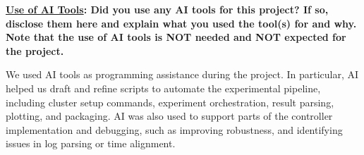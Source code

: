 \begin{enumerate}
    




\end{enumerate}

\noindent
\textbf{\underline{Use of AI Tools}: Did you use any AI tools for this project? If so, disclose them here and explain what you used the tool(s) for and why. Note that the use of AI tools is NOT needed and NOT expected for the project.}

We used AI tools as programming assistance during the project. In particular, AI helped us draft and refine scripts to automate the experimental pipeline, including cluster setup commands, experiment orchestration, result parsing, plotting, and packaging. AI was also used to support parts of the controller implementation and debugging, such as improving robustness, and identifying issues in log parsing or time alignment. 
